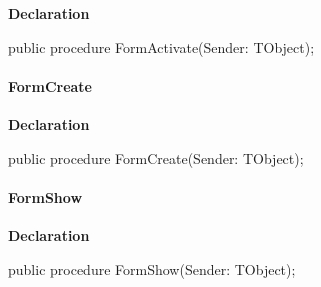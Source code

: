 \documentclass{report}
\newif\ifpdf
\begin{document}
\label{editor.TfrmEditor-FormActivate}
\begin{list}{}{
\setlength{\itemindent}{0cm}
\setlength{\listparindent}{0cm}
\setlength{\leftmargin}{\evensidemargin}
\addtolength{\leftmargin}{\tmplength}
\settowidth{\labelsep}{X}
\addtolength{\leftmargin}{\labelsep}
\setlength{\labelwidth}{\tmplength}
}
\item[\textbf{Declaration}\hfill]
\ifpdf
\begin{flushleft}
\fi
\begin{ttfamily}
public procedure FormActivate(Sender: TObject);\end{ttfamily}

\ifpdf
\end{flushleft}
\fi

\end{list}
\paragraph*{FormCreate}\hspace*{\fill}

\label{editor.TfrmEditor-FormCreate}
\begin{list}{}{
\setlength{\itemindent}{0cm}
\setlength{\listparindent}{0cm}
\setlength{\leftmargin}{\evensidemargin}
\addtolength{\leftmargin}{\tmplength}
\settowidth{\labelsep}{X}
\addtolength{\leftmargin}{\labelsep}
\setlength{\labelwidth}{\tmplength}
}
\item[\textbf{Declaration}\hfill]
\ifpdf
\begin{flushleft}
\fi
\begin{ttfamily}
public procedure FormCreate(Sender: TObject);\end{ttfamily}

\ifpdf
\end{flushleft}
\fi

\end{list}
\paragraph*{FormShow}\hspace*{\fill}

\label{editor.TfrmEditor-FormShow}
\begin{list}{}{
\setlength{\itemindent}{0cm}
\setlength{\listparindent}{0cm}
\setlength{\leftmargin}{\evensidemargin}
\addtolength{\leftmargin}{\tmplength}
\settowidth{\labelsep}{X}
\addtolength{\leftmargin}{\labelsep}
\setlength{\labelwidth}{\tmplength}
}
\item[\textbf{Declaration}\hfill]
\ifpdf
\begin{flushleft}
\fi
\begin{ttfamily}
public procedure FormShow(Sender: TObject);\end{ttfamily}

\ifpdf
\end{flushleft}
\fi

\end{list}
\end{document}

